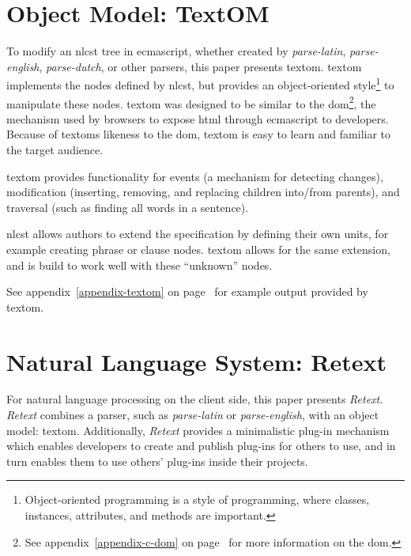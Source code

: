 \section{Object Model: TextOM}\label{object-model}

To modify an \gls{nlcst} tree in \gls{ecmascript}, whether created by
  \emph{parse-latin}, \emph{parse-english}, \emph{parse-dutch}, or other
  parsers, this paper presents \gls{textom}.
\gls{textom} implements the nodes defined by \gls{nlcst},
  but provides an object-oriented style\footnote{Object-oriented
    programming is a style of programming, where classes, instances,
    attributes, and methods are important.} to manipulate these nodes.
\gls{textom} was designed to be similar to the \gls{dom}\footnote{See
    appendix~\ref{appendix-c-dom} on page~\pageref{appendix-c-dom} for more
    information on the \gls{dom}.},
  the mechanism used by browsers to expose \gls{html} through
  \gls{ecmascript} to developers.
Because of \glspl{textom} likeness to the \gls{dom}, \gls{textom} is
  easy to learn and familiar to the target audience.

\gls{textom} provides functionality for events (a mechanism for detecting
  changes), modification (inserting, removing, and replacing children
  into\slash from parents), and traversal (such as finding all words in a
  sentence).

\gls{nlcst} allows authors to extend the specification by defining their
  own units, for example creating phrase or clause nodes.
\gls{textom} allows for the same extension, and is build to work well
  with these ``unknown'' nodes.

\medskip \noindent See appendix~\ref{appendix-textom} on
  page~\pageref{appendix-textom} for example output provided by
  \gls{textom}.

\section{Natural Language System:
  Retext}\label{natural-language-system-retext}

For natural language processing on the client side, this paper presents
  \emph{Retext}.
\emph{Retext} combines a parser, such as \emph{parse-latin} or
  \emph{parse-english}, with an object model: \gls{textom}.
Additionally, \emph{Retext} provides a minimalistic plug-in mechanism which
  enables developers to create and publish plug-ins for others to use, and in
  turn enables them to use others' plug-ins inside their projects.

